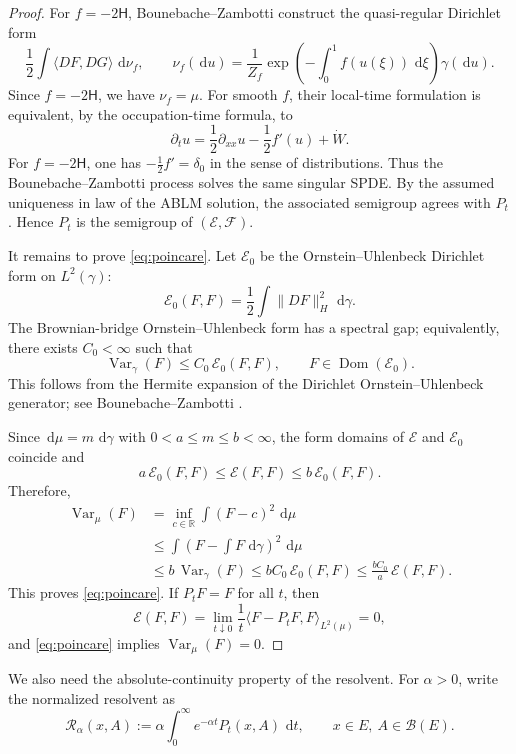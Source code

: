 \documentclass[11pt]{article}
\numberwithin{equation}{section}
\newcommand{\dd}{\,\mathrm d}
\newcommand{\1}{\mathbf 1}
\newcommand{\R}{\mathbb R}
\newcommand{\cB}{\mathcal B}
\newcommand{\cE}{\mathcal E}
\newcommand{\cF}{\mathcal F}
\newcommand{\Var}{\operatorname{Var}}
\begin{document}
\begin{proof}
For $f=-2\mathsf H$, Bounebache--Zambotti \cite[Propositions 2.4 and 3.1]{BZ14}
construct the quasi-regular Dirichlet form
\[
        \frac12\int \langle DF,DG\rangle\,\dd\nu_f,
        \qquad
        \nu_f(\dd u)=\frac1{Z_f}\exp\!\left(-\int_0^1 f(u(\xi))\,\dd\xi\right)\gamma(\dd u).
\]
Since $f=-2\mathsf H$, we have $\nu_f=\mu$. For smooth $f$, their local-time
formulation is equivalent, by the occupation-time formula, to
\[
        \partial_t u=\frac12\partial_{xx}u-\frac12 f'(u)+\dot W.
\]
For $f=-2\mathsf H$, one has $-\frac12 f'=\delta_0$ in the sense of distributions.
Thus the Bounebache--Zambotti process solves the same singular SPDE. By the
assumed uniqueness in law of the ABLM solution, the associated semigroup agrees
with $P_t$. Hence $P_t$ is the semigroup of $(\cE,\cF)$.

It remains to prove \eqref{eq:poincare}. Let $\cE_0$ be the Ornstein--Uhlenbeck
Dirichlet form on $L^2(\gamma)$:
\[
        \cE_0(F,F)=\frac12\int \|DF\|_H^2\,\dd\gamma .
\]
The Brownian-bridge Ornstein--Uhlenbeck form has a spectral gap; equivalently,
there exists $C_0<\infty$ such that
\[
        \Var_\gamma(F)\leq C_0\,\cE_0(F,F),
        \qquad F\in\operatorname{Dom}(\cE_0).
\]
This follows from the Hermite expansion of the Dirichlet Ornstein--Uhlenbeck
generator; see Bounebache--Zambotti \cite[Proposition 2.1]{BZ14}.

Since $\dd\mu=m\,\dd\gamma$ with $0<a\leq m\leq b<\infty$, the form domains of
$\cE$ and $\cE_0$ coincide and
\[
        a\,\cE_0(F,F)\leq \cE(F,F)\leq b\,\cE_0(F,F).
\]
Therefore,
\[
\begin{aligned}
        \Var_\mu(F)
        &=\inf_{c\in\R}\int (F-c)^2\,\dd\mu                                      \\
        &\leq \int \left(F-\int F\,\dd\gamma\right)^2\,\dd\mu                       \\
        &\leq b\,\Var_\gamma(F)
        \leq bC_0\,\cE_0(F,F)
        \leq \frac{bC_0}{a}\,\cE(F,F).
\end{aligned}
\]
This proves \eqref{eq:poincare}. If $P_tF=F$ for all $t$, then
\[
        \cE(F,F)
        =
        \lim_{t\downarrow0}\frac1t\langle F-P_tF,F\rangle_{L^2(\mu)}
        =0,
\]
and \eqref{eq:poincare} implies $\Var_\mu(F)=0$.
\end{proof}

We also need the absolute-continuity property of the resolvent. For $\alpha>0$,
write the normalized resolvent as
\[
        \mathcal R_\alpha(x,A)
        :=
        \alpha\int_0^\infty e^{-\alpha t}P_t(x,A)\,\dd t,
        \qquad x\in E,\ A\in\cB(E).
\]
\end{document}
